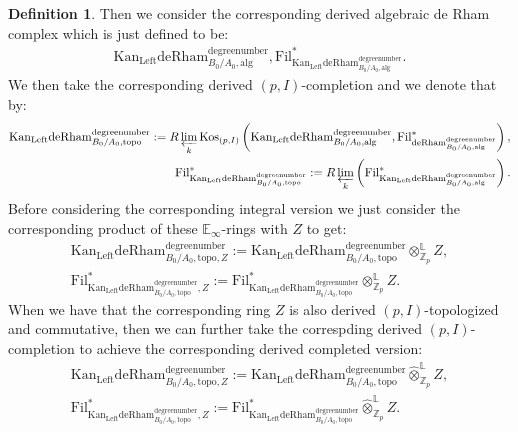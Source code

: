 \documentclass[11pt]{book}
\theoremstyle{definition}
\newtheorem{definition}[theorem]{Definition}
\numberwithin{equation}{section}
\begin{document}
\begin{definition}
Then we consider the corresponding derived algebraic de Rham complex which is just defined to be:
\begin{align}
\mathrm{Kan}_\mathrm{Left}\mathrm{deRham}^\text{degreenumber}_{B_0/A_0,\mathrm{alg}},\mathrm{Fil}^*_{\mathrm{Kan}_\mathrm{Left}\mathrm{deRham}^\text{degreenumber}_{B_0/A_0,\mathrm{alg}}}.	
\end{align}
We then take the corresponding derived $(p,I)$-completion and we denote that by:
\begin{align}
\mathrm{Kan}_\mathrm{Left}\mathrm{deRham}^\text{degreenumber}_{B_0/A_0,\mathrm{topo}}:=R\varprojlim_k \mathrm{Kos}_{(p,I)}\left(\mathrm{Kan}_\mathrm{Left}\mathrm{deRham}^\text{degreenumber}_{B_0/A_0,\mathrm{alg}},\mathrm{Fil}^*_{\mathrm{deRham}^\text{degreenumber}_{B_0/A_0,\mathrm{alg}}}\right),\\
\mathrm{Fil}^*_{\mathrm{Kan}_\mathrm{Left}\mathrm{deRham}^\text{degreenumber}_{B_0/A_0,\mathrm{topo}}}:=R\varprojlim_k\left(\mathrm{Fil}^*_{\mathrm{Kan}_\mathrm{Left}\mathrm{deRham}^\text{degreenumber}_{B_0/A_0,\mathrm{alg}}}\right).	
\end{align}
Before considering the corresponding integral version we just consider the corresponding product of these $\mathbb{E}_\infty$-rings with $Z$ to get:
\begin{align}
\mathrm{Kan}_\mathrm{Left}\mathrm{deRham}^\text{degreenumber}_{B_0/A_0,\mathrm{topo},Z}:=\mathrm{Kan}_\mathrm{Left}\mathrm{deRham}^\text{degreenumber}_{B_0/A_0,\mathrm{topo}}{\otimes}^\mathbb{L}_{\mathbb{Z}_p}Z,\\
\mathrm{Fil}^*_{\mathrm{Kan}_\mathrm{Left}\mathrm{deRham}^\text{degreenumber}_{B_0/A_0,\mathrm{topo}},Z}:=\mathrm{Fil}^*_{\mathrm{Kan}_\mathrm{Left}\mathrm{deRham}^\text{degreenumber}_{B_0/A_0,\mathrm{topo}}}{\otimes}^\mathbb{L}_{\mathbb{Z}_p}Z.	
\end{align}
When we have that the corresponding ring $Z$ is also derived $(p,I)$-topologized and commutative, then we can further take the correspding derived $(p,I)$-completion to achieve the corresponding derived completed version:
\begin{align}
\mathrm{Kan}_\mathrm{Left}\mathrm{deRham}^\text{degreenumber}_{B_0/A_0,\mathrm{topo},Z}:=\mathrm{Kan}_\mathrm{Left}\mathrm{deRham}^\text{degreenumber}_{B_0/A_0,\mathrm{topo}}\widehat{\otimes}^\mathbb{L}_{\mathbb{Z}_p}Z,\\
\mathrm{Fil}^*_{\mathrm{Kan}_\mathrm{Left}\mathrm{deRham}^\text{degreenumber}_{B_0/A_0,\mathrm{topo}},Z}:=\mathrm{Fil}^*_{\mathrm{Kan}_\mathrm{Left}\mathrm{deRham}^\text{degreenumber}_{B_0/A_0,\mathrm{topo}}}\widehat{\otimes}^\mathbb{L}_{\mathbb{Z}_p}Z.	

\end{align}
\end{definition}
\end{document}
